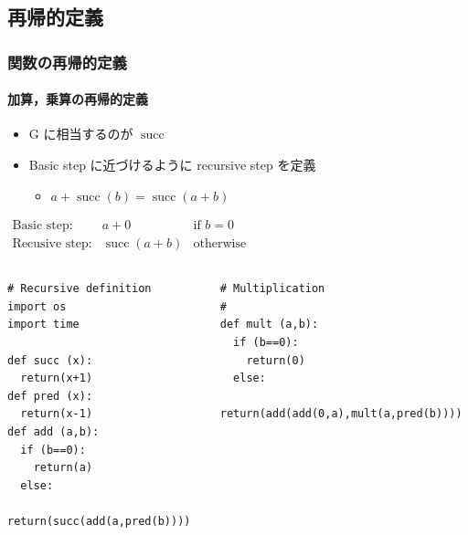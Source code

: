 \subsection{再帰的定義}
\begin{frame}
\frametitle{関数の再帰的定義}
\framesubtitle{加算，乗算の再帰的定義}
   \begin{itemize}
\item G に相当するのが \(\operatorname{succ}\)
\item Basic step に近づけるように recursive step を定義
     \begin{itemize}
\item \(a+\operatorname{succ}(b)=\operatorname{succ}(a+b)\)
     \end{itemize}
  \end{itemize}
\vspace{-1em}
  \begin{center}
  \begin{math}
    \begin{array}{lll}
\mbox{Basic step:}& a+0 & \mbox{if }b=0 \\
\mbox{Recusive step:}& \operatorname{succ}(a+b) & \mbox{otherwise}
    \end{array}
  \end{math}  
  \end{center}
\vspace{-2em}
  \begin{columns}
    \begin{column}[t]{0.4\textwidth}
      \begin{lstlisting}[caption={加算},label=add-rec]
# Recursive definition
import os
import time

def succ (x):
  return(x+1)
def pred (x):
  return(x-1)
def add (a,b):
  if (b==0):
    return(a)
  else:
    return(succ(add(a,pred(b))))
      \end{lstlisting}
    \end{column}
    \begin{column}[t]{0.55\textwidth}
      \begin{lstlisting}[firstnumber=15,caption={乗算},label=mult-rec]
# Multiplication
#
def mult (a,b):
  if (b==0):
    return(0)
  else:
    return(add(add(0,a),mult(a,pred(b))))
      \end{lstlisting}
    \end{column}
  \end{columns}
\end{frame}
